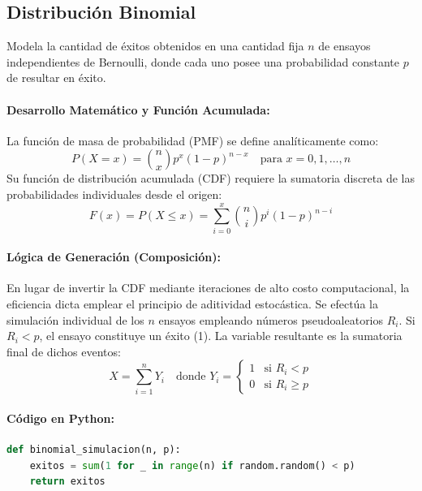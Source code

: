 \documentclass{article}
\begin{document}
\subsection{Distribución Binomial}
Modela la cantidad de éxitos obtenidos en una cantidad fija $n$ de ensayos independientes de Bernoulli, donde cada uno posee una probabilidad constante $p$ de resultar en éxito.

\paragraph{Desarrollo Matemático y Función Acumulada:}
La función de masa de probabilidad (PMF) se define analíticamente como:
\begin{equation}
P(X = x) = \binom{n}{x} p^x (1-p)^{n-x} \quad \text{para } x = 0, 1, \dots, n
\end{equation}
Su función de distribución acumulada (CDF) requiere la sumatoria discreta de las probabilidades individuales desde el origen:
\begin{equation}
F(x) = P(X \le x) = \sum_{i=0}^{x} \binom{n}{i} p^i (1-p)^{n-i}
\end{equation}

\paragraph{Lógica de Generación (Composición):}
En lugar de invertir la CDF mediante iteraciones de alto costo computacional, la eficiencia dicta emplear el principio de aditividad estocástica. Se efectúa la simulación individual de los $n$ ensayos empleando números pseudoaleatorios $R_i$. Si $R_i < p$, el ensayo constituye un éxito (1). La variable resultante es la sumatoria final de dichos eventos:
\begin{equation}
X = \sum_{i=1}^{n} Y_i \quad \text{donde } Y_i = \begin{cases} 1 & \text{si } R_i < p \\ 0 & \text{si } R_i \ge p \end{cases}
\end{equation}

\paragraph{Código en Python:}
\begin{lstlisting}[language=Python, caption=Generador Binomial por ensayos acumulados.]
def binomial_simulacion(n, p):
    exitos = sum(1 for _ in range(n) if random.random() < p)
    return exitos
\end{lstlisting}
\end{document}

